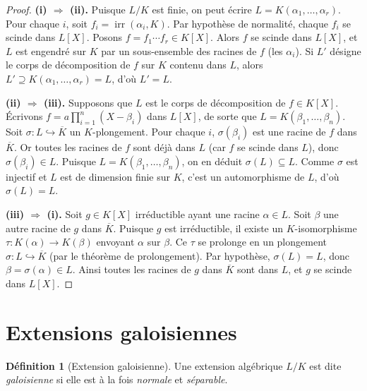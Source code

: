 \documentclass[12pt,a4paper,openany]{book}
\theoremstyle{definition}
\newtheorem{definition}{Définition}[chapter]
\newcommand{\irr}{\operatorname{irr}}
\begin{document}
\begin{proof}
\textbf{(i) $\Rightarrow$ (ii).}
Puisque $L/K$ est finie, on peut écrire $L = K(\alpha_1, \ldots, \alpha_r)$.
Pour chaque $i$, soit $f_i = \irr(\alpha_i, K)$. Par hypothèse de normalité,
chaque $f_i$ se scinde dans $L[X]$. Posons $f = f_1 \cdots f_r \in K[X]$.
Alors $f$ se scinde dans $L[X]$, et $L$ est engendré sur $K$ par un
sous-ensemble des racines de $f$ (les $\alpha_i$). Si $L'$ désigne le
corps de décomposition de $f$ sur $K$ contenu dans $L$, alors
$L' \supseteq K(\alpha_1, \ldots, \alpha_r) = L$, d'où $L' = L$.

\medskip\noindent
\textbf{(ii) $\Rightarrow$ (iii).}
Supposons que $L$ est le corps de décomposition de $f \in K[X]$. Écrivons
$f = a\prod_{i=1}^n (X - \beta_i)$ dans $L[X]$, de sorte que
$L = K(\beta_1, \ldots, \beta_n)$. Soit $\sigma \colon L \hookrightarrow
\overline{K}$ un $K$-plongement. Pour chaque $i$, $\sigma(\beta_i)$ est
une racine de $f$ dans $\overline{K}$. Or toutes les racines de $f$ sont
déjà dans $L$ (car $f$ se scinde dans $L$), donc $\sigma(\beta_i) \in L$.
Puisque $L = K(\beta_1, \ldots, \beta_n)$, on en déduit
$\sigma(L) \subseteq L$. Comme $\sigma$ est injectif et $L$ est de
dimension finie sur $K$, c'est un automorphisme de $L$, d'où
$\sigma(L) = L$.

\medskip\noindent
\textbf{(iii) $\Rightarrow$ (i).}
Soit $g \in K[X]$ irréductible ayant une racine $\alpha \in L$. Soit
$\beta$ une autre racine de $g$ dans $\overline{K}$. Puisque $g$ est
irréductible, il existe un $K$-isomorphisme $\tau \colon K(\alpha) \to
K(\beta)$ envoyant $\alpha$ sur $\beta$. Ce $\tau$ se prolonge en un
plongement $\sigma \colon L \hookrightarrow \overline{K}$ (par le théorème
de prolongement). Par hypothèse, $\sigma(L) = L$, donc
$\beta = \sigma(\alpha) \in L$. Ainsi toutes les racines de $g$ dans
$\overline{K}$ sont dans $L$, et $g$ se scinde dans $L[X]$.
\end{proof}

\section{Extensions galoisiennes}\label{sec:def-galoisienne}

\begin{definition}[Extension galoisienne]\label{def:extension-galoisienne}
Une extension algébrique $L/K$ est dite \emph{galoisienne} si elle est
à la fois \emph{normale} et
\emph{séparable}.
\end{definition}
\end{document}
